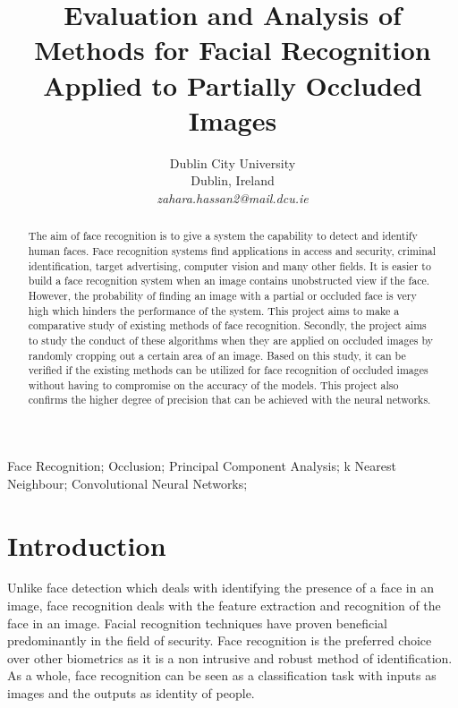 \documentclass[conference]{IEEEtran}
\begin{document}
\title{Evaluation and Analysis of Methods for Facial Recognition Applied to Partially Occluded Images}

\author{
Dublin City University\\
Dublin, Ireland \\
\textit{zahara.hassan2@mail.dcu.ie
}}

\maketitle

\begin{abstract}
The aim of face recognition is to give a system the capability to detect and identify human faces. Face recognition systems find applications in access and security, criminal identification, target advertising, computer vision and many other fields. It is easier to build a face recognition system when an image contains unobstructed view if the face. However, the probability of finding an image with a partial or occluded face is very high which hinders the performance of the system. This project aims to make a comparative study of existing methods of face recognition. Secondly, the project aims to study the conduct of these algorithms when they are applied on occluded images by randomly cropping out a certain area of an image. Based on this study, it can be verified if the existing methods can be utilized for face recognition of occluded images without having to compromise on the accuracy of the models. This project also confirms the higher degree of precision that can be achieved with the neural networks.

\end{abstract}

\begin{IEEEkeywords}
Face Recognition; Occlusion; Principal Component Analysis; k Nearest Neighbour; Convolutional Neural Networks;

\end{IEEEkeywords}

\section{Introduction}
\label{sec: 1.introduction}
Unlike face detection which deals with identifying the presence of a face in an image, face recognition deals with the feature extraction and recognition of the face in an image. Facial recognition techniques have proven beneficial predominantly in the field of security. Face recognition is the preferred choice over other biometrics as it is a non intrusive and robust method of identification. As a whole, face recognition can be seen as a classification task with inputs as images and the outputs as identity of people. 
\end{document}
